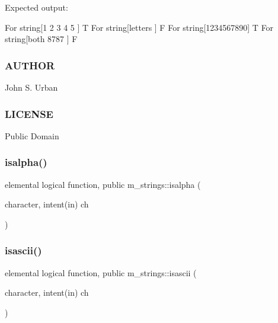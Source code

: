 Expected output\+: \begin{DoxyVerb}For string[1 2 3 4 5 ] T
For string[letters   ] F
For string[1234567890] T
For string[both 8787 ] F
\end{DoxyVerb}


\subsubsection*{A\+U\+T\+H\+OR}

John S. Urban \subsubsection*{L\+I\+C\+E\+N\+SE}

Public Domain \mbox{\label{namespacem__strings_a5cf6d7fbd1b3ea17e37c6213c6ba0fdb}} 
\subsubsection{\texorpdfstring{isalpha()}{isalpha()}}
{\footnotesize\ttfamily elemental logical function, public m\+\_\+strings\+::isalpha (\begin{DoxyParamCaption}\item[{character, intent(in)}]{ch }\end{DoxyParamCaption})}

\mbox{\label{namespacem__strings_afb63e9fefbc04e4e9a2ec4df4334078c}} 
\subsubsection{\texorpdfstring{isascii()}{isascii()}}
{\footnotesize\ttfamily elemental logical function, public m\+\_\+strings\+::isascii (\begin{DoxyParamCaption}\item[{character, intent(in)}]{ch }\end{DoxyParamCaption})}

\mbox{\label{namespacem__strings_aebb074d3971c0b93e39d1cfaa45658d8}} 
